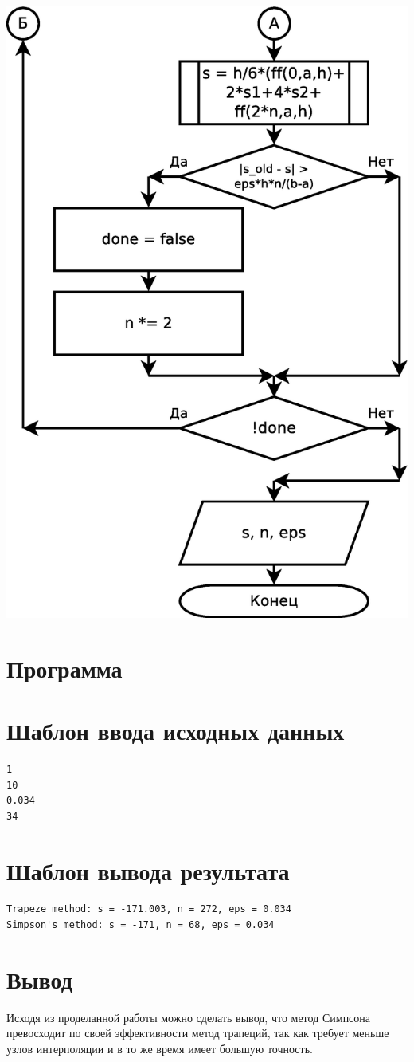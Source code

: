 \documentclass[a4paper]{article}
\begin{document}
\includegraphics[scale=0.35]{schemes/simpson2}

\section{Программа}
{
\fontsize{12pt}{14pt}
\selectfont

}

\section{Шаблон ввода исходных данных}
{
\fontsize{12pt}{14pt}
\selectfont
\begin{verbatim}
1
10
0.034
34
\end{verbatim}
}

\section{Шаблон вывода результата}
{
\fontsize{12pt}{14pt}
\selectfont
\begin{verbatim}
Trapeze method: s = -171.003, n = 272, eps = 0.034
Simpson's method: s = -171, n = 68, eps = 0.034
\end{verbatim}
}

\section{Вывод}
Исходя из проделанной работы можно сделать вывод, что метод Симпсона превосходит
по своей эффективности метод трапеций, так как требует меньше узлов интерполяции
и в то же время имеет большую точность.
\end{document}
